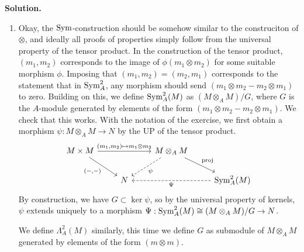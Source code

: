 \documentclass[a4paper,11pt]{article}
\begin{document}
\textbf{Solution.}
\begin{enumerate}
    \item
        Okay, the $\operatorname{Sym}$-construction should be somehow similar to the construciton
        of $\otimes$, and ideally all proofs of properties simply follow from
        the universal
        property of the tensor product. In the construction of the tensor product,
        $(m_1, m_2)$ corresponds to the image of $\phi(m_1 \otimes m_2)$ for 
        some suitable morphism $\phi$. Imposing that $(m_1, m_2) = (m_2, m_1)$ 
        corresponds to the statement that in $\operatorname{Sym}^2_A$, any morphism 
        should send $(m_1 \otimes m_2 - m_2 \otimes m_1)$ to zero. 
        Building on this, we define $\operatorname{Sym}^2_A(M)$ as $(M \otimes_A M)/ G$, where
        $G$ is the $A$-module generated by elements of the form $(m_1 \otimes m_2 -
        m_2 \otimes m_1)$. We check that this works. With the notation of the 
        exercise, we first obtain a morphism $\psi: M \otimes_A M \to N$ by
        the UP of the tensor product.
        \[\begin{tikzcd}[ampersand replacement=\&]
        	{M \times M} \&\& {M \otimes_A M} \\
        	\& N \&\& {\Sym_A^2(M)}
        	\arrow["{(-,-)}"', from=1-1, to=2-2]
        	\arrow["{(m_1, m_2) \mapsto m_1 \otimes m_2}", from=1-1, to=1-3]
        	\arrow["\psi", dashed, from=1-3, to=2-2]
        	\arrow["{\text{proj}}", from=1-3, to=2-4]
        	\arrow["\Psi", dashed, from=2-4, to=2-2]
        \end{tikzcd}\]
        By construction, we have $G \subset \ker \psi$, so by the universal property
        of kernels, $\psi$ extends uniquely to a morphism $\Psi: \operatorname{Sym}^2_A(M)
        \cong (M \otimes_A M) / G \to N$. 

        We define $\Lambda^2_A(M)$ similarly, this time we define $G$ as
        submodule of 
        $M \otimes_A M$ generated by elements of the form $(m \otimes m)$. 


\end{enumerate}
\end{document}
